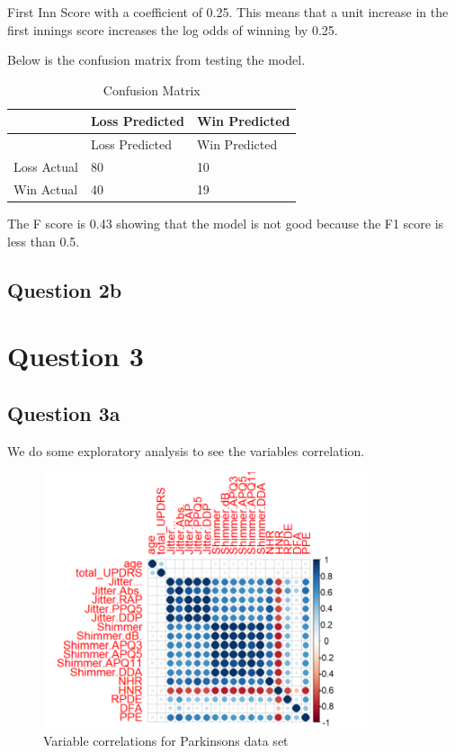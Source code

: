\documentclass[
]{article}
\begin{document}
First Inn Score with a coefficient of 0.25. This means that a unit
increase in the first innings score increases the log odds of winning by
0.25.

Below is the confusion matrix from testing the model.

\begin{longtable}[]{@{}lll@{}}
\caption{Confusion Matrix}\tabularnewline
\toprule\noalign{}
& Loss Predicted & Win Predicted \\
\midrule\noalign{}
\endfirsthead
\toprule\noalign{}
& Loss Predicted & Win Predicted \\
\midrule\noalign{}
\endhead
\bottomrule\noalign{}
\endlastfoot
Loss Actual & 80 & 10 \\
Win Actual & 40 & 19 \\
\end{longtable}

The F score is 0.43 showing that the model is not good because the F1
score is less than 0.5.

\hypertarget{question-2b}{%
\subsection{Question 2b}\label{question-2b}}

\hypertarget{question-3}{%
\section{Question 3}\label{question-3}}

\hypertarget{question-3a}{%
\subsection{Question 3a}\label{question-3a}}

We do some exploratory analysis to see the variables correlation.

\begin{figure}
\centering
\includegraphics[width=3.76042in,height=\textheight]{corr_parkinsons.png}
\caption{Variable correlations for Parkinsons data set}
\end{figure}
\end{document}
